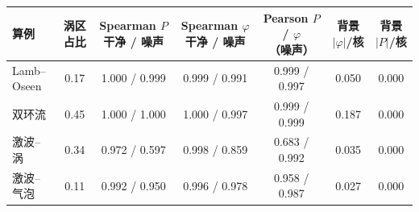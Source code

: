 \begin{tabular}{lcccccc}\toprule 算例 & 涡区占比 & Spearman $P$ 干净 / 噪声 & Spearman $\varphi$ 干净 / 噪声 & Pearson $P$ / $\varphi$（噪声） & 背景 $|\varphi|$/核 & 背景 $|P|$/核\\\midrule
Lamb–Oseen & 0.17 & 1.000 / 0.999 & 0.999 / 0.991 & 0.999 / 0.997 & 0.050 & 0.000\\
双环流 & 0.45 & 1.000 / 1.000 & 1.000 / 0.997 & 0.999 / 0.999 & 0.187 & 0.000\\
激波–涡 & 0.34 & 0.972 / 0.597 & 0.998 / 0.859 & 0.683 / 0.992 & 0.035 & 0.000\\
激波–气泡 & 0.11 & 0.992 / 0.950 & 0.996 / 0.978 & 0.958 / 0.987 & 0.027 & 0.000\\
\bottomrule\end{tabular}
